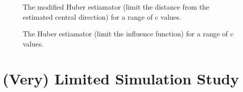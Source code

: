 \documentclass{article}\usepackage[]{graphicx}\usepackage[]{color}
\newenvironment{knitrout}{}{} %
\begin{document}
% 

\begin{knitrout}
\color{fgcolor}









\begin{figure}[]


{\centering {}

}

\caption[The modified Huber estiamator (limit the distance from the estimated central direction) for a range of c values]{The modified Huber estiamator (limit the distance from the estimated central direction) for a range of c values.\label{fig:huberContd}}
\end{figure}


\end{knitrout}


\begin{knitrout}
\color{fgcolor}









\begin{figure}[]


{\centering {}

}

\caption[The Huber estiamator (limit the influence function) for a range of c values]{The Huber estiamator (limit the influence function) for a range of c values.\label{fig:huberIFAnimation}}
\end{figure}


\end{knitrout}









\section{(Very) Limited Simulation Study}
\end{document}
